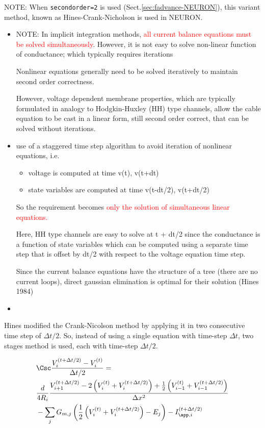 NOTE: When \verb!secondorder=2! is used (Sect.\ref{sec:fadvance-NEURON}), this
variant method, known as Hines-Crank-Nicholson is used in NEURON.
\begin{itemize}
  
  \item NOTE: In implicit integration methods, \textcolor{red}{all current
  balance equations must be solved simultaneously}. However, it is not easy to
  solve non-linear function of conductance; which typically requires iterations
  
Nonlinear equations generally need to be solved iteratively to maintain second
order correctness.

However, voltage dependent membrane properties, which are typically formulated
in analogy to Hodgkin-Huxley (HH) type channels, allow the cable equation to be
cast in a linear form, still second order correct, that can be solved without
iterations.

  \item use of a staggered time step algorithm to avoid iteration of nonlinear
  equations, i.e. 
\begin{itemize}
  \item voltage is computed at time v(t), v(t+dt)
  \item state variables are computed at time v(t-dt/2), v(t+dt/2)
\end{itemize}
So the requirement becomes \textcolor{red}{ only the
solution of simultaneous linear equations.}

Here, HH type channels are easy to solve at t + dt/2 since the conductance is
a function of state variables which can be computed using a separate time step
that is offset by dt/2 with respect to the voltage equation time step.

Since the current balance equations have the structure of a tree (there are no
current loops), direct gaussian elimination is optimal for their solution (Hines
1984)


  \item
\end{itemize}

Hines modified the Crank-Nicolson method by applying it in two consecutive time
step of $\Delta t/2$. So, instead of using a single equation with time-step
$\Delta t$, two stages method is used, each with time-step $\Delta t/2$.

\begin{equation}
\begin{split}
  &\Csc \frac{V_i^{(t+\Delta t/2)} - V_i^{(t)}}{\Delta t/2} = \\
  &\frac{d}{4R_i}
  \frac{ V_{i+1}^{(t + \Delta t/2)} -
  2 \left( V_i^{(t)} + V_i^{(t + \Delta t/2)} \right) + 
  \frac{1}{2} \left( V_{i-1}^{(t)} + V_{i-1}^{(t +
  \Delta t/2)} \right) }{\Delta x^2} \\
  &- \sum_j G_{m,j} \left(
  \frac{1}{2}
  \left( V_{i}^{(t)} + V_{i}^{(t + \Delta t/2)}\right) - E_j \right)   
  - I_{\app,i}^{(t+\Delta t/2)}
\end{split}
\end{equation}

